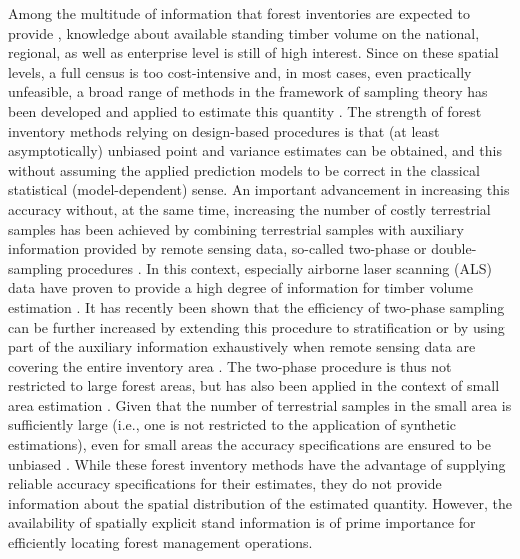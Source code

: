 Among the multitude of information that forest inventories are expected to provide \citep{mcroberts2010}, knowledge about available standing timber volume on the national, regional, as well as enterprise level is still of high interest. Since on these spatial levels, a full census is too cost-intensive and, in most cases, even practically unfeasible, a broad range of methods in the framework of sampling theory has been developed and applied to estimate this quantity \citep{gregoire2008, mandallaz2008, schreuder1993}. The strength of forest inventory methods relying on design-based procedures is that (at least asymptotically) unbiased point and variance estimates can be obtained, and this without assuming the applied prediction models to be correct in the classical statistical (model-dependent) sense. An important advancement in increasing this accuracy without, at the same time, increasing the number of costly terrestrial samples has been achieved by combining terrestrial samples with auxiliary information provided by remote sensing data, so-called two-phase or double-sampling procedures \citep{gregoire2008, mandallaz2008, cochran2007, kohl2006}. In this context, especially airborne laser scanning (ALS) data have proven to provide a high degree of information for timber volume estimation \citep{holmgren2004, naesset2002, naesset2007}. It has recently been shown that the efficiency of two-phase sampling can be further increased by extending this procedure to stratification \citep{saborowski2010, vonluepke2013} or by using part of the auxiliary information exhaustively when remote sensing data are covering the entire inventory area \citep{mandallaz2013b}. The two-phase procedure is thus not restricted to large forest areas, but has also been applied in the context of small area estimation \citep{breidenbach2012}. Given that the number of terrestrial samples in the small area is sufficiently large (i.e., one is not restricted to the application of synthetic estimations), even for small areas the accuracy specifications are ensured to be unbiased \citep{mandallaz2013a}. While these forest inventory methods have the advantage of supplying reliable accuracy specifications for their estimates, they do not provide information about the spatial distribution of the estimated quantity. However, the availability of spatially explicit stand information is of prime importance for efficiently locating forest management operations.\par
